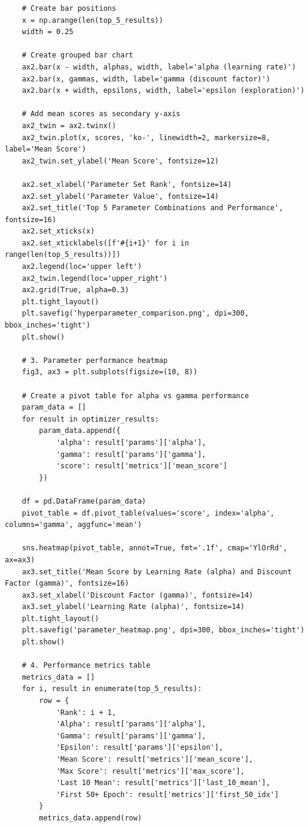 \documentclass[submit]{../harvardml}
\begin{document}
\begin{lstlisting}
    # Create bar positions
    x = np.arange(len(top_5_results))
    width = 0.25
    
    # Create grouped bar chart
    ax2.bar(x - width, alphas, width, label='alpha (learning rate)')
    ax2.bar(x, gammas, width, label='gamma (discount factor)')
    ax2.bar(x + width, epsilons, width, label='epsilon (exploration)')
    
    # Add mean scores as secondary y-axis
    ax2_twin = ax2.twinx()
    ax2_twin.plot(x, scores, 'ko-', linewidth=2, markersize=8, label='Mean Score')
    ax2_twin.set_ylabel('Mean Score', fontsize=12)
    
    ax2.set_xlabel('Parameter Set Rank', fontsize=14)
    ax2.set_ylabel('Parameter Value', fontsize=14)
    ax2.set_title('Top 5 Parameter Combinations and Performance', fontsize=16)
    ax2.set_xticks(x)
    ax2.set_xticklabels([f'#{i+1}' for i in range(len(top_5_results))])
    ax2.legend(loc='upper left')
    ax2_twin.legend(loc='upper_right')
    ax2.grid(True, alpha=0.3)
    plt.tight_layout()
    plt.savefig('hyperparameter_comparison.png', dpi=300, bbox_inches='tight')
    plt.show()
    
    # 3. Parameter performance heatmap
    fig3, ax3 = plt.subplots(figsize=(10, 8))
    
    # Create a pivot table for alpha vs gamma performance
    param_data = []
    for result in optimizer_results:
        param_data.append({
            'alpha': result['params']['alpha'],
            'gamma': result['params']['gamma'],
            'score': result['metrics']['mean_score']
        })
    
    df = pd.DataFrame(param_data)
    pivot_table = df.pivot_table(values='score', index='alpha', columns='gamma', aggfunc='mean')
    
    sns.heatmap(pivot_table, annot=True, fmt='.1f', cmap='YlOrRd', ax=ax3)
    ax3.set_title('Mean Score by Learning Rate (alpha) and Discount Factor (gamma)', fontsize=16)
    ax3.set_xlabel('Discount Factor (gamma)', fontsize=14)
    ax3.set_ylabel('Learning Rate (alpha)', fontsize=14)
    plt.tight_layout()
    plt.savefig('parameter_heatmap.png', dpi=300, bbox_inches='tight')
    plt.show()
    
    # 4. Performance metrics table
    metrics_data = []
    for i, result in enumerate(top_5_results):
        row = {
            'Rank': i + 1,
            'Alpha': result['params']['alpha'],
            'Gamma': result['params']['gamma'],
            'Epsilon': result['params']['epsilon'],
            'Mean Score': result['metrics']['mean_score'],
            'Max Score': result['metrics']['max_score'],
            'Last 10 Mean': result['metrics']['last_10_mean'],
            'First 50+ Epoch': result['metrics']['first_50_idx']
        }
        metrics_data.append(row)
    

\end{lstlisting}
\end{document}
